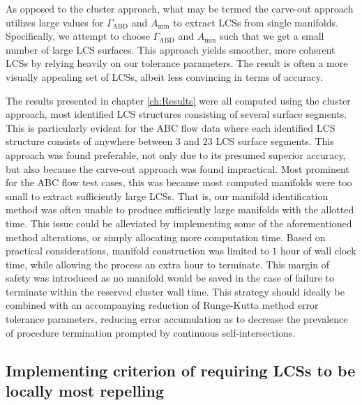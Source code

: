 As opposed to the cluster approach, what may be termed the carve-out approach utilizes large values for  $\Gamma_{\text{ABD}}$ and $A_{\text{min}}$ to extract LCSs from single manifolds. Specifically, we attempt to choose $\Gamma_{\text{ABD}}$ and $A_{\text{min}}$ such that we get a small number of large LCS surfaces. This approach yields smoother, more coherent LCSs by relying heavily on our tolerance parameters. The result is often a more visually appealing set of LCSs, albeit less convincing in terms of accuracy.

The results presented in chapter \ref{ch:Results} were all computed using the cluster approach, most identified LCS structures consisting of several surface segments. This is particularly evident for the ABC flow data where each identified LCS structure consists of anywhere between $3$ and $23$ LCS surface segments. This approach was found preferable, not only due to its presumed superior accuracy, but also because the carve-out approach was found impractical. Most prominent for the ABC flow test cases, this was because most computed manifolds were too small to extract sufficiently large LCSs. That is, our manifold identification method was often unable to produce sufficiently large manifolds with the allotted time. This issue could be alleviated by implementing some of the aforementioned method alterations, or simply allocating more computation time. Based on practical considerations, manifold construction was limited to $1$ hour of wall clock time, while allowing the process an extra hour to terminate. This margin of safety was introduced as no manifold would be saved in the case of failure to terminate within the reserved cluster wall time. This strategy should ideally be combined with an accompanying reduction of Runge-Kutta method error tolerance parameters, reducing error accumulation as to decrease the prevalence of procedure termination prompted by continuous self-intersections.

\subsection{Implementing criterion of requiring LCSs to be locally most repelling}\label{sec:ambiguity}

